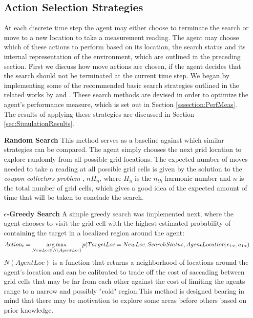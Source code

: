 \subsection{Action Selection Strategies}\label{subsubsec:ActionSelection}
At each discrete time step the agent may either choose to terminate the search or move to a new location to take a measurement reading. The agent may choose which of these actions to perform based on its location, the search status and its internal representation of the environment, which are outlined in the preceding section. First we discuss how move actions are chosen, if the agent decides that the search should not be terminated at the current time step. We began by implementing some of the recommended basic search strategies outlined in the related works by \citeauthor{Chung2007ASearch} \cite{Chung2007ASearch} and \citeauthor{Waharte2010SupportingUAVs} \cite{Waharte2010SupportingUAVs}. These search methods are devised in order to optimize the agent's performance measure, which is set out in Section \ref{sssection:PerfMeas}. The results of applying these strategies are discussed in Section \ref{sec:SimulationResults}.\par 
\textbf{Random Search}
This method serves as a baseline against which similar strategies can be compared. The agent simply chooses the next grid location to explore randomly from all possible grid locations. The expected number of moves needed to take a reading at all possible grid cells is given by the solution to the \textit{coupon collectors problem} \cite{Erdos1961OnTheory}, $nH_n$, where $H_n$ is the $n_{th}$ harmonic number and $n$ is the total number of grid cells, which gives a good idea of the expected amount of time that will be taken to conclude the search.

\textbf{$\epsilon$-Greedy Search}
A simple greedy search was implemented next, where the agent chooses to visit the grid cell with the highest estimated probability of containing the target in a localized region around the agent:
\footnotesize
\[
Action_t = \operatorname*{arg\,max}_{NewLoc \in N(AgentLoc)}{p(TargetLoc = NewLoc, SearchStatus, AgentLocation| e_{1:t}, u_{1:t})}
\]
\normalsize
$N(AgentLoc)$ is a function that returns a neighborhood of locations around the agent's location and can be calibrated to trade off the cost of saccading between grid cells that may be far from each other against the cost of limiting the agents range to a narrow and possibly "cold" region.This method is designed bearing in mind that there may be motivation to explore some areas before others based on prior knowledge. 

